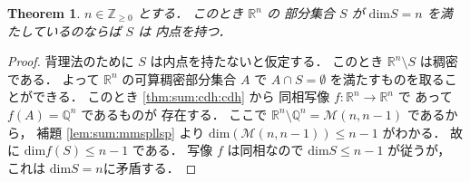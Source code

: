 \documentclass[leqno, a4paper, 12pt]{jsarticle}
\theoremstyle{plain}
\newtheorem{thm}{Theorem}[section]
\theoremstyle{definition}
\theoremstyle{remark}
\newcommand{\zz}{\mathbb{Z}}
\newcommand{\qq}{\mathbb{Q}}
\newcommand{\rr}{\mathbb{R}}
\newcommand{\yodim}{\mathrm{dim}}
\newcommand{\yospspfont}{\mathscr}
\newcommand{\yommsp}[2]{\yospspfont{M}({#1}, {#2})}
\numberwithin{equation}{section}
\begin{document}
\begin{thm}\label{thm:sum:cdh:conclusion}
$n\in \zz_{\ge 0}$
とする．
このとき
$\rr^{n}$
の
部分集合
$S$
が
$\yodim S=n$
を満たしているのならば
$S$
は
内点を持つ．
\end{thm}
\begin{proof}
背理法のために
$S$
は内点を持たないと仮定する．
このとき
$\rr^{n}\setminus S$
は稠密である．
よって
$\rr^{n}$
の可算稠密部分集合
$A$
で
$A\cap S=\emptyset$
を満たすものを取ることができる．
このとき
\ref{thm:sum:cdh:cdh}
から
同相写像
$f\colon \rr^{n}\to \rr^{n}$
で
あって
$f(A)=\qq^{n}$
であるものが
存在する．
ここで
$\rr^{n}\setminus \qq^{n}=\yommsp{n}{n-1}$
であるから，
補題
\ref{lem:sum:mmspllsp}
より
$\yodim(\yommsp{n}{n-1})\le n-1$
がわかる．
故に
$\yodim f(S)\le n-1$
である．
写像
$f$
は同相なので
$\yodim S\le n-1$
が従うが，
これは
$\yodim S=n$に矛盾する．
\end{proof}


































\end{document}
